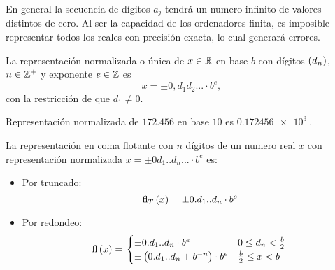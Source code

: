 \begin{obs}
    En general la secuencia de dígitos $a_j$ tendrá un numero infinito de valores distintos de cero. Al ser la capacidad de los ordenadores finita, es imposible representar todos los reales con precisión exacta, lo cual generará errores.
\end{obs}

\begin{defi}
    La representación normalizada o única de $x \in \mathbb{R}$ en base $b$ con dígitos $\left(  d_n\right) $, $n \in \mathbb{Z}^{+}$ y exponente $e \in \mathbb{Z}$ es
    \[
      x = \pm 0,d_1d_2... \cdot b^e \nonumber,
    \]
    con la restricción de que $d_1 \neq 0$.
\end{defi}

\begin{example}
  Representación normalizada de $172.456$ en base $10$ es $\SI{0.172456e3}{}$.
\end{example}

\begin{defi}
	La representación en coma flotante con $n$ dígitos de un numero real $x$ con representación normalizada $x = \pm 0d_1..d_n... \cdot b^e$ es:
	\begin{itemize}
		\item  Por truncado:
		\[
			\text{fl}_T\left( x\right)  = \pm 0.d_1..d_n \cdot b^e \nonumber
		\]
		\item Por redondeo:
			\[
			\text{fl}\left( x\right)  = \left.
			\begin{cases}
			\pm 0.d_1..d_n \cdot b^e & 0 \leq d_n < \frac{b}{2} \\
			\pm \left( 0.d_1..d_n + b^{-n}\right)  \cdot b^e & \frac{b}{2} \leq x < b
			\end{cases}
			\right.
			\]
	\end{itemize}
\end{defi}

